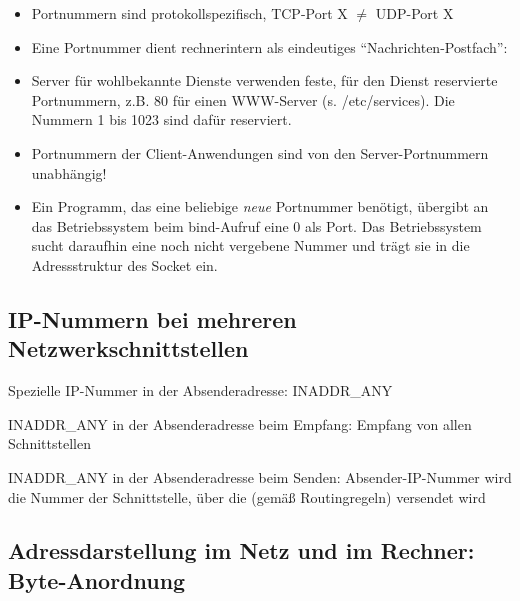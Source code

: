 \documentclass[12pt,utf8]{article}
\begin{document}
\begin{itemize}
\item
  Portnummern sind protokollspezifisch, TCP-Port X $\neq$ UDP-Port X

\item
  Eine Portnummer dient rechnerintern als eindeutiges
  "`Nachrichten-Postfach"':


\item
  Server für wohlbekannte Dienste verwenden
  feste, für den Dienst reservierte Portnummern, z.B. 80 für einen
  WWW-Server (s. /etc/services). Die Nummern 1 bis 1023 sind dafür
  reserviert.

\item
  Portnummern der Client-Anwendungen sind von den Server-Portnummern unabhängig!

\item
  Ein Programm, das eine beliebige {\em neue\/} Portnummer benötigt, übergibt
  an das Betriebssystem beim bind-Aufruf eine 0 als Port. Das Betriebssystem
  sucht daraufhin eine noch nicht vergebene Nummer und trägt sie in die
  Adressstruktur des Socket ein.
\end{itemize}


\subsection*{IP-Nummern bei mehreren Netzwerkschnittstellen}

  Spezielle IP-Nummer in der Absenderadresse: INADDR\_ANY

  \begin{titemize}
  \item INADDR\_ANY in der Absenderadresse beim Empfang: Empfang von allen Schnittstellen
  \item INADDR\_ANY in der Absenderadresse beim Senden: Absender-IP-Nummer wird die Nummer der
         Schnittstelle, über die (gemäß Routingregeln) versendet wird
  \end{titemize}



\subsection*{Adressdarstellung im Netz und im Rechner: Byte-Anordnung}
\end{document}
